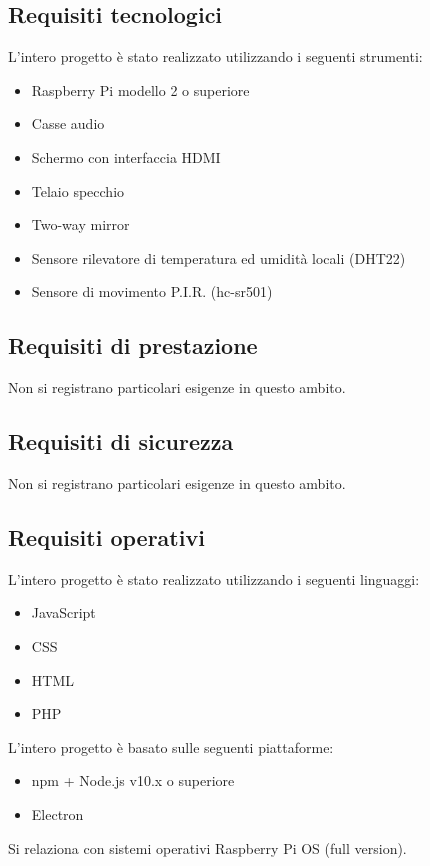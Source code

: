 \documentclass[a4paper,11pt,titlepage]{article}       %
\begin{document}
    \subsection{Requisiti tecnologici}
        L'intero progetto è stato realizzato utilizzando i seguenti strumenti:
        \begin{itemize}
            \item Raspberry Pi modello 2 o superiore
            \item Casse audio
            \item Schermo con interfaccia HDMI
            \item Telaio specchio
            \item \gls{Two-way mirror}
            \item Sensore rilevatore di temperatura ed umidità locali (DHT22)
            \item \gls{Sensore di movimento P.I.R.} (hc-sr501)
        \end{itemize}
        
    \subsection{Requisiti di prestazione}
        Non si registrano particolari esigenze in questo ambito.
    
    \subsection{Requisiti di sicurezza}
        Non si registrano particolari esigenze in questo ambito.
    
    \subsection{Requisiti operativi}
        L'intero progetto è stato realizzato utilizzando i seguenti linguaggi:
        \begin{itemize}
            \item JavaScript
            \item CSS
            \item HTML
            \item PHP
        \end{itemize}
        L'intero progetto è basato sulle seguenti piattaforme:
        \begin{itemize}
            \item npm + Node.js v10.x o superiore
            \item Electron
        \end{itemize}
        Si relaziona con sistemi operativi Raspberry Pi OS (full version).
    
\end{document}

